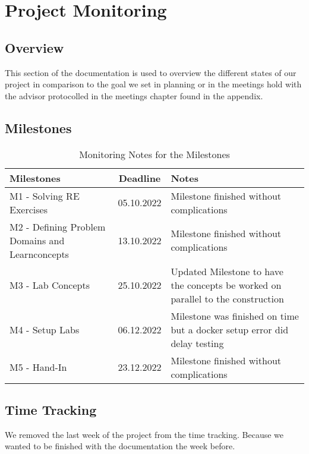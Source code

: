 \section{Project Monitoring}
\subsection{Overview}
This section of the documentation is used to overview the different states of our project in comparison to the goal we set in planning or in the meetings hold with the advisor protocolled in the meetings chapter found in the appendix.

\subsection{Milestones}

\begin{table}[H]
    \centering
    \begin{tabular}[]{|| p{5cm} | c | p{6.2cm} ||}
        \hline
        Milestones & Deadline & Notes \\
        \hline \hline
        M1 - Solving RE Exercises & 05.10.2022 & Milestone finished without complications \\
        \hline
        M2 - Defining Problem Domains and Learnconcepts& 13.10.2022 & Milestone finished without complications \\
        \hline
        M3 - Lab Concepts & 25.10.2022 & Updated Milestone to have the concepts be worked on parallel to the construction \\
        \hline
        M4 - Setup Labs & 06.12.2022 & Milestone was finished on time but a docker setup error did delay testing\\
        \hline
        M5 - Hand-In & 23.12.2022 & Milestone finished without complications \\
        \hline
    \end{tabular}
    \caption{Monitoring Notes for the Milestones}
    \label{milestones_monitoring_table}
\end{table}

\subsection{Time Tracking}

We removed the last week of the project from the time tracking. Because we wanted to be finished with the documentation the week before.

